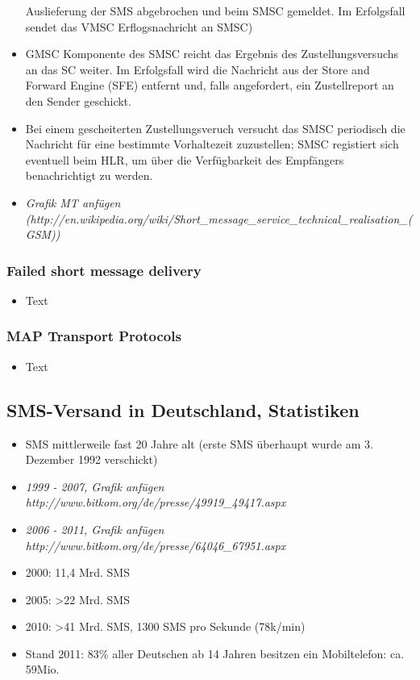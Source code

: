 \documentclass[german,12pt,a4paper]{article}
\begin{document}
\begin{itemize}
		Auslieferung der SMS abgebrochen und beim SMSC gemeldet. Im Erfolgsfall sendet das VMSC Erflogsnachricht an SMSC)
	\item GMSC Komponente des SMSC reicht das Ergebnis des Zustellungsversuchs an das SC 
		weiter. Im Erfolgsfall wird die Nachricht aus der Store and Forward Engine (SFE) 
		entfernt und, falls angefordert, ein Zustellreport an den Sender geschickt.
	\item Bei einem gescheiterten Zustellungsveruch versucht das SMSC periodisch die 
		Nachricht für eine bestimmte Vorhaltezeit zuzustellen; SMSC registiert sich 
		eventuell beim HLR, um über die Verfügbarkeit des Empfängers benachrichtigt zu 
		werden.
	\item \textit{Grafik MT anfügen \\(http://en.wikipedia.org/wiki/Short\_message\_service\_technical\_realisation\_(GSM))}
\end{itemize}

\subsubsection{Failed short message delivery}
\begin{itemize}
	\item Text
\end{itemize}

\subsubsection{MAP Transport Protocols}
\begin{itemize}
	\item Text
\end{itemize}

\subsection{SMS-Versand in Deutschland, Statistiken}
\begin{itemize}
	\item SMS mittlerweile fast 20 Jahre alt (erste SMS überhaupt wurde am 3. Dezember 1992 verschickt)
	\item \textit{1999 - 2007, Grafik anfügen http://www.bitkom.org/de/presse/49919\_49417.aspx}
	\item \textit{2006 - 2011, Grafik anfügen http://www.bitkom.org/de/presse/64046\_67951.aspx}
	\item 2000: 11,4 Mrd. SMS
	\item 2005: \textgreater 22 Mrd. SMS
	\item 2010: \textgreater 41 Mrd. SMS, 1300 SMS pro Sekunde (78k/min)
	\item Stand 2011: 83\% aller Deutschen ab 14 Jahren besitzen ein Mobiltelefon: ca. 59Mio.
\end{itemize}
\end{document}

